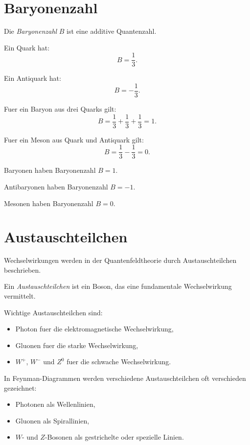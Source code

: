 \section{Baryonenzahl}

\begin{definitionbox}
Die \emph{Baryonenzahl} $B$ ist eine additive Quantenzahl.

Ein Quark hat:
\[
    B=\frac{1}{3}.
\]

Ein Antiquark hat:
\[
    B=-\frac{1}{3}.
\]
\end{definitionbox}

\begin{conceptbox}
Fuer ein Baryon aus drei Quarks gilt:
\[
    B=\frac{1}{3}+\frac{1}{3}+\frac{1}{3}=1.
\]

Fuer ein Meson aus Quark und Antiquark gilt:
\[
    B=\frac{1}{3}-\frac{1}{3}=0.
\]
\end{conceptbox}

\begin{examtipbox}
Baryonen haben Baryonenzahl $B=1$.

Antibaryonen haben Baryonenzahl $B=-1$.

Mesonen haben Baryonenzahl $B=0$.
\end{examtipbox}

\section{Austauschteilchen}

Wechselwirkungen werden in der Quantenfeldtheorie durch Austauschteilchen beschrieben.

\begin{definitionbox}
Ein \emph{Austauschteilchen} ist ein Boson, das eine fundamentale Wechselwirkung
vermittelt.
\end{definitionbox}

\begin{conceptbox}
Wichtige Austauschteilchen sind:
\begin{itemize}
    \item Photon fuer die elektromagnetische Wechselwirkung,
    \item Gluonen fuer die starke Wechselwirkung,
    \item $W^+$, $W^-$ und $Z^0$ fuer die schwache Wechselwirkung.
\end{itemize}
\end{conceptbox}

\begin{notebox}
In Feynman-Diagrammen werden verschiedene Austauschteilchen oft verschieden gezeichnet:
\begin{itemize}
    \item Photonen als Wellenlinien,
    \item Gluonen als Spirallinien,
    \item $W$- und $Z$-Bosonen als gestrichelte oder spezielle Linien.
\end{itemize}
\end{notebox}

